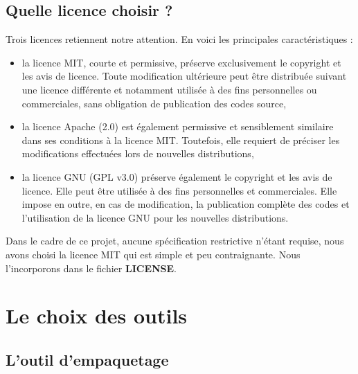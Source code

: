 \documentclass[twoside,a4paper,11pt,frenchb,openany]{report}
\begin{document}
\section{Quelle licence choisir ?}
	
Trois licences retiennent notre attention. En voici les principales caractéristiques :
\begin{itemize}
\item	la licence MIT, courte et permissive, préserve exclusivement le copyright et les avis de licence. Toute modification ultérieure peut être distribuée suivant une licence différente et notamment utilisée à des fins personnelles ou commerciales, sans obligation de publication des codes source,
\item	la licence Apache (2.0) est également permissive et sensiblement similaire dans ses conditions à la licence MIT. Toutefois, elle requiert de préciser les modifications effectuées lors de nouvelles distributions,
\item	la licence GNU (GPL v3.0) préserve également le copyright et les avis de licence. Elle peut être utilisée à des fins personnelles et commerciales. Elle impose en outre, en cas de modification, la publication complète des codes et l'utilisation de la licence GNU pour les nouvelles distributions.
\end{itemize}

Dans le cadre de ce projet, aucune spécification restrictive n'étant requise, nous avons choisi la licence MIT qui est simple et peu contraignante. Nous l'incorporons dans le fichier \textbf{LICENSE}.




\chapter{Le choix des outils}





\section{L'outil d'empaquetage}
	
\end{document}
